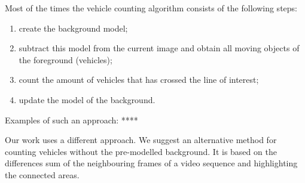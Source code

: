 \documentclass[12pt,a4paper,oneside,titlepage]{article}
\begin{document}
Most of the times the vehicle counting algorithm consists of the following steps:


\begin{enumerate}
  \item create the background model;
  \item subtract this model from the current image and obtain all moving objects of the foreground (vehicles);
  \item count the amount of vehicles that has crossed the line of interest;
  \item update the model of the background.
\end{enumerate}



Examples of such an approach: ****\

Our work uses a different approach. We suggest an alternative method for counting vehicles without the pre-modelled background.
It is based on the differences sum  of the neighbouring frames of a video sequence and highlighting the connected areas.



























\newpage
\end{document}
